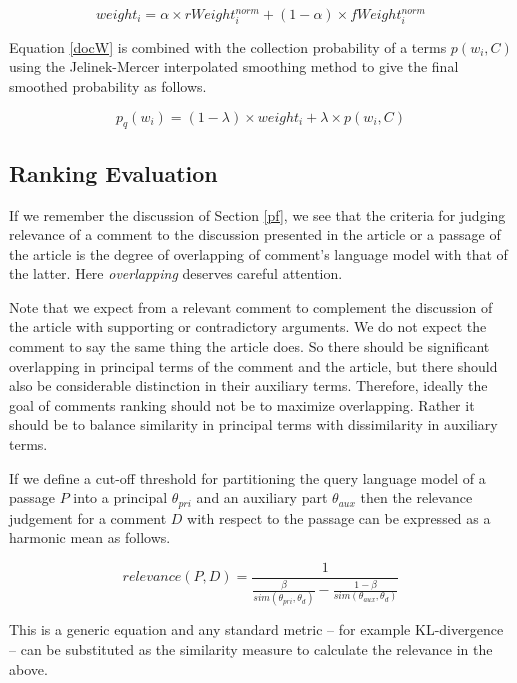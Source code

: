 \documentclass[article]{IEEEtran}
\begin{document}
\begin{equation}
\label{docW}
weight_i = \alpha \times rWeight_i^{norm} + (1 - \alpha) \times fWeight_i^{norm}
\end{equation}

Equation \ref{docW} is combined with the collection probability of a terms $p(w_i, C)$ using the Jelinek-Mercer interpolated smoothing method \cite{1371580} to give the final smoothed probability as follows.   

\begin{equation}
\label{wProb}
p_q(w_i) = (1 - \lambda) \times weight_i + \lambda \times p(w_i, C) 
\end{equation}

\subsection{Ranking Evaluation}
If we remember the discussion of Section \ref{pf}, we see that the criteria for judging relevance of a comment to the discussion presented in the article or a passage of the article is the degree of overlapping of comment's language model with that of the latter. Here \textit{overlapping} deserves careful attention.

Note that we expect from a relevant comment to complement the discussion of the article with supporting or contradictory arguments. We do not expect the comment to say the same thing the article does. So there should be significant overlapping in principal terms of the comment and the article, but there should also be considerable distinction in their auxiliary terms. Therefore, ideally the goal of comments ranking should not be to maximize overlapping. Rather it should be to balance similarity in principal terms with dissimilarity in auxiliary terms.

If we define a cut-off threshold for partitioning the query language model of a passage $P$ into a principal $\theta_{pri}$ and an auxiliary part $\theta_{aux}$ then the relevance judgement for a comment $D$ with respect to the passage can be expressed as a harmonic mean as follows.

\begin{equation}
\label{relMes}
relevance(P,D) = \frac{1}{\frac{\beta}{sim(\theta_{pri}, \theta_d)} - \frac{1 - \beta}{sim(\theta_{aux}, \theta_d)}}
\end{equation}           

This is a generic equation and any standard metric -- for example KL-divergence -- can be substituted as the similarity measure to calculate the relevance in the above.
\end{document}
